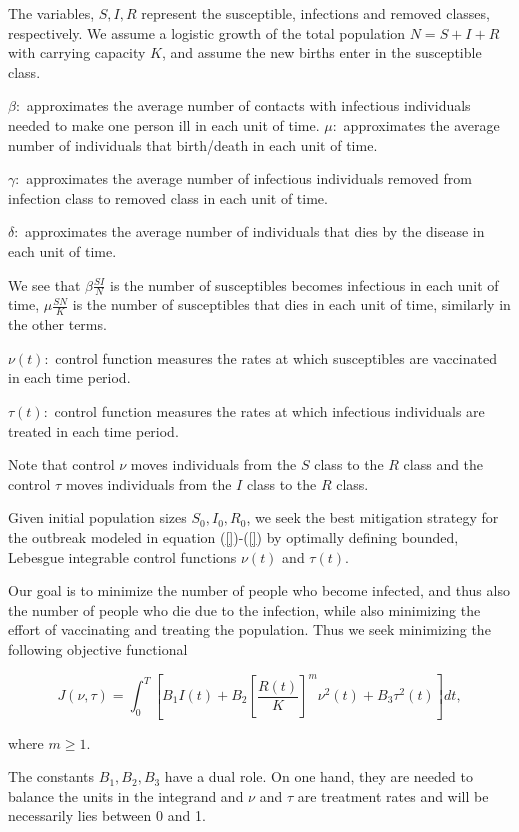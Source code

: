 The variables,  $S,I, R$ represent the susceptible, infections and removed 
classes, respectively. We assume a logistic growth of the total population 
$N=S+I+R$ with carrying capacity $K$, and assume the new births enter in the 
susceptible class.

$\beta :$ approximates the average number of contacts with infectious 
individuals needed to make one person ill in each unit of time.
$\mu :$ approximates the average number of individuals that birth/death in each 
unit of time.

$\gamma :$ approximates the average number of infectious individuals removed 
from infection class to removed class in each unit of time.

$\delta :$ approximates the average number of individuals that dies by the 
disease in each unit of time.

We see that $\beta \frac{SI}{N}$ is the number of susceptibles becomes 
infectious in each unit of time, $\mu \frac{SN}{K}$ is the number of 
susceptibles that dies in each unit of time, similarly in the other terms. 

$\nu (t):$ control function measures the rates at which susceptibles are 
vaccinated in each time period.

$\tau (t):$ control function measures the rates at which infectious individuals 
are treated in each time period.

Note that control $\nu$ moves individuals from the $S$ class to the $R$ class 
and the control $\tau$ moves individuals from the $I$ class to the $R$ class.

Given initial population sizes $S_0,I_0,R_0$, we seek the best mitigation 
strategy for the outbreak modeled in equation (\ref{})-(\ref{}) by optimally 
defining bounded, Lebesgue integrable control functions $\nu (t)$ and $\tau 
(t)$.

Our goal is to minimize the number of people who become infected, and thus also 
the number of people who die due to the infection, while also minimizing the 
effort of vaccinating and treating the population. Thus we seek minimizing the 
following objective functional

\begin{equation}\label{eq.1.4.5}
J(\nu,\tau)=\int_{0}^{T} [B_1 I(t)+B_2[\frac{R(t)}{K}]^m \nu^2(t)+B_3\tau^2(t)] 
dt,
\end{equation}

where $m \geq 1$.

The constants $B_1,B_2,B_3$ have a dual role. On one hand, they are needed to 
balance the units in the integrand and $\nu$ and $\tau$ are treatment rates and 
will be necessarily lies between 0 and 1.

